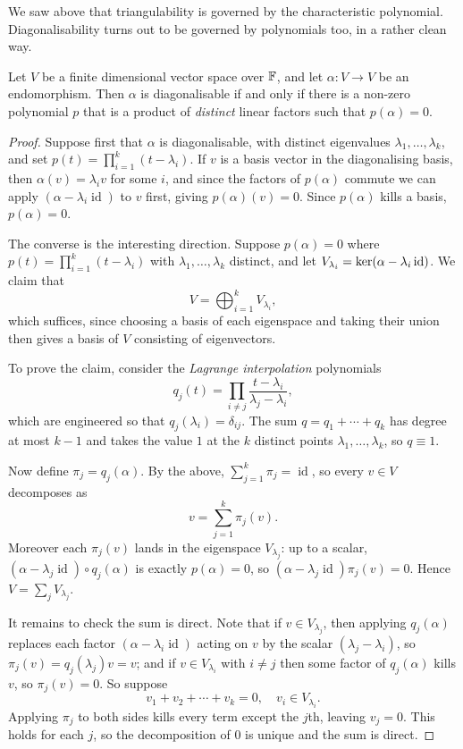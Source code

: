 \documentclass[a4paper]{scrartcl}
\begin{document}
We saw above that triangulability is governed by the characteristic polynomial. Diagonalisability turns out to be governed by polynomials too, in a rather clean way.

\begin{theorem}
    Let $V$ be a finite dimensional vector space over $\mathbb{F}$, and let $\alpha: V \rightarrow V$ be an endomorphism. Then $\alpha$ is diagonalisable if and only if there is a non-zero polynomial $p$ that is a product of \emph{distinct} linear factors such that $p(\alpha) = 0$.
\end{theorem}
\begin{proof}
    Suppose first that $\alpha$ is diagonalisable, with distinct eigenvalues $\lambda_1, \dots, \lambda_k$, and set $p(t) = \prod_{i = 1}^k (t - \lambda_i)$. If $v$ is a basis vector in the diagonalising basis, then $\alpha(v) = \lambda_i v$ for some $i$, and since the factors of $p(\alpha)$ commute we can apply $(\alpha - \lambda_i \operatorname{id})$ to $v$ first, giving $p(\alpha)(v) = 0$. Since $p(\alpha)$ kills a basis, $p(\alpha) = 0$.

    The converse is the interesting direction. Suppose $p(\alpha) = 0$ where $p(t) = \prod_{i = 1}^k (t - \lambda_i)$ with $\lambda_1, \dots, \lambda_k$ distinct, and let $V_{\lambda_i} = \operatorname{ker} (\alpha - \lambda_i \operatorname{id})$. We claim that
    $$
    V = \bigoplus_{i = 1}^k V_{\lambda_i},
    $$
    which suffices, since choosing a basis of each eigenspace and taking their union then gives a basis of $V$ consisting of eigenvectors.

    To prove the claim, consider the \emph{Lagrange interpolation} polynomials
    $$
    q_j(t) = \prod_{i \neq j} \frac{t - \lambda_i}{\lambda_j - \lambda_i},
    $$
    which are engineered so that $q_j(\lambda_i) = \delta_{ij}$. The sum $q = q_1 + \cdots + q_k$ has degree at most $k - 1$ and takes the value $1$ at the $k$ distinct points $\lambda_1, \dots, \lambda_k$, so $q \equiv 1$.

    Now define $\pi_j = q_j(\alpha)$. By the above, $\sum_{j = 1}^k \pi_j = \operatorname{id}$, so every $v \in V$ decomposes as
    $$
    v = \sum_{j = 1}^k \pi_j (v).
    $$
    Moreover each $\pi_j(v)$ lands in the eigenspace $V_{\lambda_j}$: up to a scalar, $(\alpha - \lambda_j \operatorname{id}) \circ q_j(\alpha)$ is exactly $p(\alpha) = 0$, so $(\alpha - \lambda_j \operatorname{id})\pi_j(v) = 0$. Hence $V = \sum_{j} V_{\lambda_j}$.

    It remains to check the sum is direct. Note that if $v \in V_{\lambda_j}$, then applying $q_j(\alpha)$ replaces each factor $(\alpha - \lambda_i\operatorname{id})$ acting on $v$ by the scalar $(\lambda_j - \lambda_i)$, so $\pi_j(v) = q_j(\lambda_j) v = v$; and if $v \in V_{\lambda_i}$ with $i \neq j$ then some factor of $q_j(\alpha)$ kills $v$, so $\pi_j(v) = 0$. So suppose
    $$
    v_1 + v_2 + \cdots + v_k = 0, \quad v_i \in V_{\lambda_i}.
    $$
    Applying $\pi_j$ to both sides kills every term except the $j$th, leaving $v_j = 0$. This holds for each $j$, so the decomposition of $0$ is unique and the sum is direct.
\end{proof}
\end{document}
